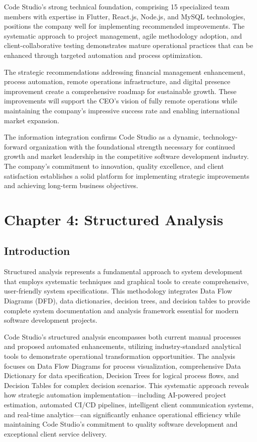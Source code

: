 \documentclass[12pt,a4paper]{article}
\begin{document}
Code Studio's strong technical foundation, comprising 15 specialized team members with expertise in Flutter, React.js, Node.js, and MySQL technologies, positions the company well for implementing recommended improvements. The systematic approach to project management, agile methodology adoption, and client-collaborative testing demonstrates mature operational practices that can be enhanced through targeted automation and process optimization.

The strategic recommendations addressing financial management enhancement, process automation, remote operations infrastructure, and digital presence improvement create a comprehensive roadmap for sustainable growth. These improvements will support the CEO's vision of fully remote operations while maintaining the company's impressive success rate and enabling international market expansion.

The information integration confirms Code Studio as a dynamic, technology-forward organization with the foundational strength necessary for continued growth and market leadership in the competitive software development industry. The company's commitment to innovation, quality excellence, and client satisfaction establishes a solid platform for implementing strategic improvements and achieving long-term business objectives.

\newpage
\pagestyle{chapter3style}

\section{Chapter 4: Structured Analysis}

\subsection{Introduction}

Structured analysis represents a fundamental approach to system development that employs systematic techniques and graphical tools to create comprehensive, user-friendly system specifications. This methodology integrates Data Flow Diagrams (DFD), data dictionaries, decision trees, and decision tables to provide complete system documentation and analysis framework essential for modern software development projects.

Code Studio's structured analysis encompasses both current manual processes and proposed automated enhancements, utilizing industry-standard analytical tools to demonstrate operational transformation opportunities. The analysis focuses on Data Flow Diagrams for process visualization, comprehensive Data Dictionary for data specification, Decision Trees for logical process flows, and Decision Tables for complex decision scenarios. This systematic approach reveals how strategic automation implementation—including AI-powered project estimation, automated CI/CD pipelines, intelligent client communication systems, and real-time analytics—can significantly enhance operational efficiency while maintaining Code Studio's commitment to quality software development and exceptional client service delivery.
\end{document}

